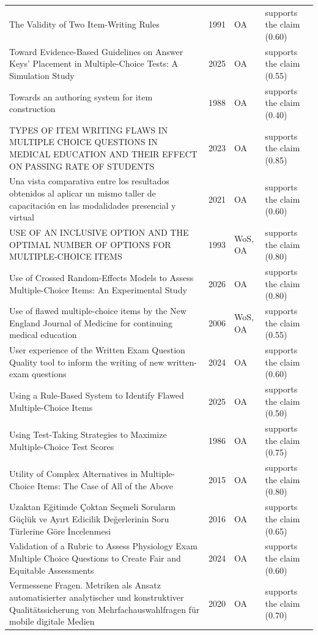 \begin{longtable}{@{}%
  >{\raggedright\arraybackslash}p{}c%
  >{\raggedright\arraybackslash}p{}%
  >{\raggedright\arraybackslash}p{}@{}}
The Validity of Two Item-Writing Rules & 1991 & OA & supports the claim (0.60) \\
Toward Evidence-Based Guidelines on Answer Keys' Placement in Multiple-Choice Tests: A Simulation Study & 2025 & OA & supports the claim (0.55) \\
Towards an authoring system for item construction & 1988 & OA & supports the claim (0.40) \\
TYPES OF ITEM WRITING FLAWS IN MULTIPLE CHOICE QUESTIONS IN MEDICAL EDUCATION AND THEIR EFFECT ON PASSING RATE OF STUDENTS & 2023 & OA & supports the claim (0.85) \\
Una vista comparativa entre los resultados obtenidos al aplicar un mismo taller de capacitación en las modalidades presencial y virtual & 2021 & OA & supports the claim (0.60) \\
USE OF AN INCLUSIVE OPTION AND THE OPTIMAL NUMBER OF OPTIONS FOR MULTIPLE-CHOICE ITEMS & 1993 & WoS, OA & supports the claim (0.80) \\
Use of Crossed Random-Effects Models to Assess Multiple-Choice Items: An Experimental Study & 2026 & OA & supports the claim (0.80) \\
Use of flawed multiple-choice items by the New England Journal of Medicine for continuing medical education & 2006 & WoS, OA & supports the claim (0.55) \\
User experience of the Written Exam Question Quality tool to inform the writing of new written-exam questions & 2024 & OA & supports the claim (0.60) \\
Using a Rule-Based System to Identify Flawed Multiple-Choice Items & 2025 & OA & supports the claim (0.50) \\
Using Test-Taking Strategies to Maximize Multiple-Choice Test Scores & 1986 & OA & supports the claim (0.75) \\
Utility of Complex Alternatives in Multiple-Choice Items: The Case of All of the Above & 2015 & OA & supports the claim (0.80) \\
Uzaktan Eğitimde Çoktan Seçmeli Soruların Güçlük ve Ayırt Edicilik Değerlerinin Soru Türlerine Göre İncelenmesi & 2016 & OA & supports the claim (0.65) \\
Validation of a Rubric to Assess Physiology Exam Multiple Choice Questions to Create Fair and Equitable Assessments & 2024 & OA & supports the claim (0.60) \\
Vermessene Fragen. Metriken als Ansatz automatisierter analytischer und konstruktiver Qualitätssicherung von Mehrfachauswahlfragen für mobile digitale Medien & 2020 & OA & supports the claim (0.70) \\

\end{longtable}

